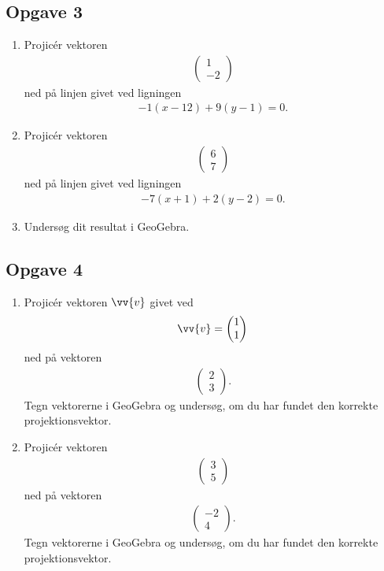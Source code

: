 \subsection*{Opgave 3}

\begin{enumerate}[label=\roman*)]
	\item Projicér vektoren 
	\begin{align*}
		\begin{pmatrix}
			1 \\ -2
		\end{pmatrix}
	\end{align*}
	ned på linjen givet ved ligningen
	\begin{align*}
		-1(x-12) + 9(y-1) = 0.
	\end{align*}
	\item Projicér vektoren 
	\begin{align*}
		\begin{pmatrix}
			6 \\  7
		\end{pmatrix}
	\end{align*}
	ned på linjen givet ved ligningen
	\begin{align*}
		-7(x+1) + 2(y-2) = 0.
	\end{align*}
	\item Undersøg dit resultat i GeoGebra.
\end{enumerate}


\subsection*{Opgave 4}
\begin{enumerate}[label=\roman*)]
	\item Projicér vektoren $\vv{v}$ givet ved
	\begin{align*}
		\vv{v} = 
		\begin{pmatrix}
			1 \\ 1
		\end{pmatrix}
	\end{align*} ned på vektoren
	\begin{align*}
		\begin{pmatrix}
			2 \\ 3
		\end{pmatrix}.
	\end{align*}
	Tegn vektorerne i GeoGebra og undersøg, om du har fundet den korrekte projektionsvektor. 
	\item Projicér vektoren 
	\begin{align*}
		\begin{pmatrix}
			3\\5
		\end{pmatrix}
	\end{align*}
	ned på vektoren 
	\begin{align*}
		\begin{pmatrix}
			-2 \\ 4
		\end{pmatrix}.
	\end{align*}
	Tegn vektorerne i GeoGebra og undersøg, om du har fundet den korrekte projektionsvektor.
\end{enumerate}


